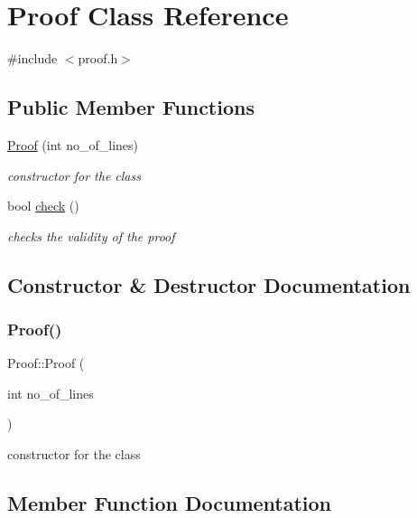 \hypertarget{class_proof}{}\section{Proof Class Reference}
\label{class_proof}


{\ttfamily \#include $<$proof.\+h$>$}

\subsection*{Public Member Functions}
\begin{DoxyCompactItemize}
\item 
\mbox{\hyperlink{class_proof_a529ccbf31c08b4b820f62e7f92f1b014}{Proof}} (int no\+\_\+of\+\_\+lines)
\begin{DoxyCompactList}\small\item\em constructor for the class \end{DoxyCompactList}\item 
bool \mbox{\hyperlink{class_proof_a0c3878c0a014dfd04c470e7c2cd2afae}{check}} ()
\begin{DoxyCompactList}\small\item\em checks the validity of the proof \end{DoxyCompactList}\end{DoxyCompactItemize}


\subsection{Constructor \& Destructor Documentation}
\mbox{\label{class_proof_a529ccbf31c08b4b820f62e7f92f1b014}} 
\subsubsection{\texorpdfstring{Proof()}{Proof()}}
{\footnotesize\ttfamily Proof\+::\+Proof (\begin{DoxyParamCaption}\item[{int}]{no\+\_\+of\+\_\+lines }\end{DoxyParamCaption})\hspace{0.3cm}{\ttfamily [inline]}}



constructor for the class 



\subsection{Member Function Documentation}
\mbox{\label{class_proof_a0c3878c0a014dfd04c470e7c2cd2afae}} 
